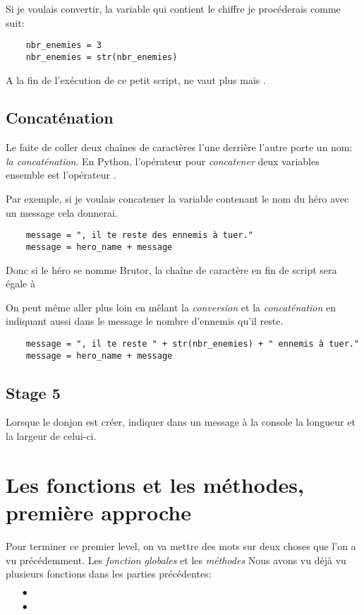 Si je voulais convertir, la variable  qui contient le chiffre  je procéderais comme suit:

\begin{lstlisting}
	nbr_enemies = 3
	nbr_enemies = str(nbr_enemies)
\end{lstlisting}

A la fin de l'exécution de ce petit script,  ne vaut plus  mais .

\subsection{Concaténation}
Le faite de coller deux chaînes de caractères l'une derrière l'autre porte un nom: \emph{la concaténation}.
En Python, l'opérateur pour \emph{concatener} deux variables ensemble est l'opérateur \codeintext{+}.

Par exemple, si je voulais concatener la variable contenant le nom du héro avec un message cela donnerai.
 
\begin{lstlisting}
	message = ", il te reste des ennemis à tuer."
	message = hero_name + message
\end{lstlisting}

Donc si le héro se nomme Brutor, la chaîne de caractère en fin de script sera égale à 

On peut même aller plus loin en mêlant la \emph{conversion} et la \emph{concaténation} en indiquant aussi dans le message le nombre d'ennemis qu'il reste.

\begin{lstlisting}
	message = ", il te reste " + str(nbr_enemies) + " ennemis à tuer."
	message = hero_name + message
\end{lstlisting}

\subsection{Stage 5}
Lorsque le donjon est créer, indiquer dans un message à la console la longueur et la largeur de celui-ci.

\section{Les fonctions et les méthodes, première approche}

Pour terminer ce premier level, on va mettre des mots sur deux choses que l'on a vu précédemment. Les \emph{fonction globales} et les \emph{méthodes}
Nous avons vu déjà vu plusieurs fonctions dans les parties précédentes:
\begin{itemize}
	\item[$\bullet$] 
	\item[$\bullet$] 
\end{itemize}

